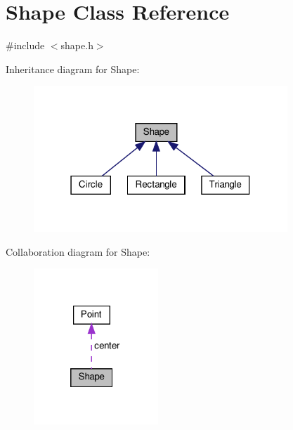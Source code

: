 \hypertarget{class_shape}{}\section{Shape Class Reference}
\label{class_shape}


{\ttfamily \#include $<$shape.\+h$>$}



Inheritance diagram for Shape\+:
\nopagebreak
\begin{figure}[H]
\begin{center}
\leavevmode
\includegraphics[width=271pt]{class_shape__inherit__graph}
\end{center}
\end{figure}


Collaboration diagram for Shape\+:
\nopagebreak
\begin{figure}[H]
\begin{center}
\leavevmode
\includegraphics[width=133pt]{class_shape__coll__graph}
\end{center}
\end{figure}
